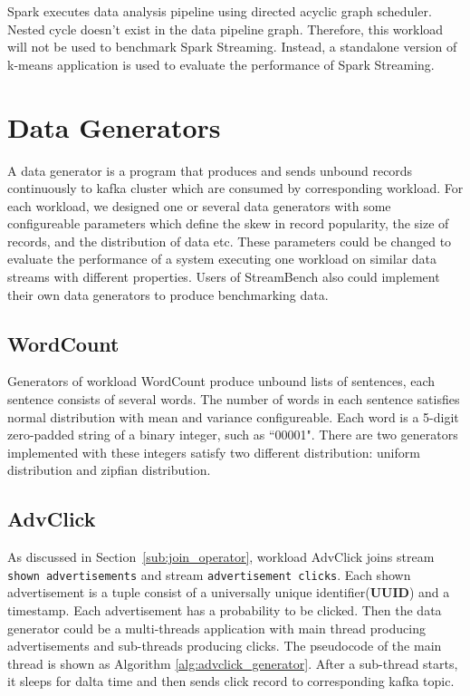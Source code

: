 Spark executes data analysis pipeline using directed acyclic graph scheduler.  Nested cycle doesn't exist in the data pipeline graph. Therefore, this workload will not be used to benchmark Spark Streaming. Instead, a standalone version of k-means application is used to evaluate the performance of Spark Streaming.

\section{Data Generators}
\label{section:data_generator}
 A data generator is a program that produces and sends unbound records continuously to kafka cluster which are consumed by corresponding workload. For each workload, we designed one or several data generators with some configureable parameters which define the skew in record popularity, the size of records, and the distribution of data etc. These parameters could be changed to evaluate the performance of a system executing one workload on similar data streams with different properties. Users of StreamBench also could implement their own data generators to produce benchmarking data.

\subsection{WordCount}
\label{subsection:wordcount_generator}

Generators of workload WordCount produce unbound lists of sentences, each sentence consists of several words. The number of words in each sentence satisfies normal distribution with mean and variance configureable. Each word is a 5-digit zero-padded string of a binary integer, such as ``00001". There are two generators implemented with these integers satisfy two different distribution: uniform distribution and zipfian distribution.

\subsection{AdvClick}

As discussed in Section~\ref{sub:join_operator}, workload AdvClick joins stream \texttt{shown advertisements} and stream \texttt{advertisement clicks}. Each shown advertisement is a tuple consist of a universally unique identifier(\textbf{UUID}) and a timestamp. Each advertisement has a probability to be clicked. Then the data generator could be a multi-threads application with main thread producing advertisements and sub-threads producing clicks. The pseudocode of the main thread is shown as Algorithm \ref{alg:advclick_generator}. After a sub-thread starts, it sleeps for dalta time and then sends click record to corresponding kafka topic. 

